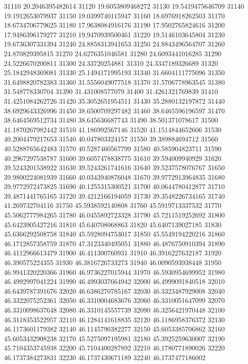 {31110 20.2046395482614
31120 19.6053809468272
31130 19.5419475646709
31140 19.1912653079937
31150 19.0399740115947
31160 18.6976918262503
31170 18.6734706779625
31180 17.9638084916176
31190 17.9502765824616
31200 17.9486396179277
31210 19.9470939500461
31220 19.5146103645804
31230 19.6736307331394
31240 24.8858313941653
31250 24.8843496564707
31260 24.870829395815
31270 24.6276351046581
31280 24.6093441016285
31290 24.5226670200811
31300 24.33720254881
31310 24.3347189326689
31320 25.1842948369081
31330 25.1494171995193
31340 31.6604111775096
31350 31.6498820782383
31360 31.5556049077518
31370 31.5706778963545
31380 31.548778330704
31390 31.431008577079
31400 31.4261321769839
31410 31.4251084262726
31420 35.3052651954511
31430 35.2880132197872
31440 38.6929643326996
31450 38.6500709297482
31460 38.6465596196597
31470 38.6464569512734
31480 38.645636687743
31490 38.501371078617
31500 41.1870267982442
31510 41.186992567146
31520 41.1514844652606
31530 40.2004479217653
31540 40.047803324157
31550 39.389884694712
31560 40.5288765642483
31570 40.5287460567799
31580 40.585904823711
31590 40.2967297538787
31600 39.6057478838775
31610 39.594009940929
31620 39.5243201538922
31630 39.5243261741616
31640 39.5237578076767
31650 39.9800224081939
31660 40.0343940876048
31670 39.9772913964835
31680 39.9772972473825
31690 40.1255315300521
31700 40.0644780412877
31710 39.4871441765165
31720 39.4212166194059
31730 39.3548226734165
31740 41.269732704116
31750 45.5938592140808
31760 45.5919713337532
31770 45.5062777984265
31780 46.0455892723328
31790 45.7211519252692
31800 45.6423905427216
31810 45.640708068863
31820 45.6407139027185
31830 45.6366292508758
31840 45.5928094753017
31850 45.5549194220216
31860 46.1712857358759
31870 47.3123340495051
31880 46.4876750910394
31890 46.4112966613479
31900 46.411300760931
31910 46.3916227632187
31920 46.390575224355
31930 46.3816726733273
31940 46.0090593938448
31950 46.9941320220366
31960 46.9736227015944
31970 46.5930954699952
31980 46.4992997041224
31990 46.4993037664942
32000 46.4999091840518
32010 46.6439787391676
32020 46.6386270785167
32030 46.3323487929008
32040 46.3322075252361
32050 46.3310004683676
32060 46.3310051647099
32070 46.3310098637648
32080 46.3310145557739
32090 46.3256421970448
32100 46.3118353522957
32110 46.1284141618835
32120 46.1186958376372
32130 46.1173601179382
32140 46.1145790382277
32150 45.6053385706862
32160 45.6053432908238
32170 45.5275097195981
32180 45.3925259630007
32190 45.7104353745938
32200 45.7104400287892
32210 46.1780771890026
32220 46.1737384273831
32230 46.1737430671189
32240 46.1737477186002
}
